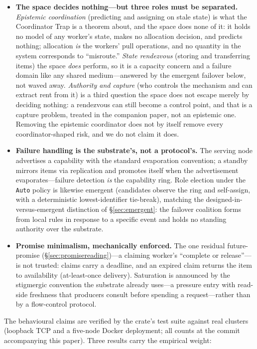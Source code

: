 \documentclass[11pt]{article}
\theoremstyle{definition}
\theoremstyle{plain}
\theoremstyle{plain}
\begin{document}
\begin{itemize}
\item \textbf{The space decides nothing---but three roles must be
  separated.} \emph{Epistemic coordination} (predicting and assigning on stale
  state) is what the Coordinator Trap is a theorem about, and the space does none of
  it: it holds no model of any worker's state, makes no allocation decision, and
  predicts nothing; allocation \emph{is} the workers' pull operations, and no
  quantity in the system corresponds to ``misroute.'' \emph{State rendezvous}
  (storing and transferring items) the space \emph{does} perform, so it is a capacity
  concern and a failure domain like any shared medium---answered by the emergent
  failover below, not waved away. \emph{Authority and capture} (who controls the
  mechanism and can extract rent from it) is a third question the space does not
  escape merely by deciding nothing: a rendezvous can still become a control point,
  and that is a capture problem, treated in the companion paper, not an epistemic
  one. Removing the epistemic coordinator does not by itself remove every
  coordinator-shaped risk, and we do not claim it does.
\item \textbf{Failure handling is the substrate's, not a protocol's.} The
  serving node advertises a capability with the standard evaporation
  convention; a standby mirrors items via replication and promotes itself
  when the advertisement evaporates---failure detection \emph{is} the
  capability ring. Role election under the \texttt{Auto} policy is
  likewise emergent (candidates observe the ring and self-assign, with a
  deterministic lowest-identifier tie-break), matching the
  designed-in-versus-emergent distinction of \S\ref{sec:emergent}: the
  failover coalition forms from local rules in response to a specific
  event and holds no standing authority over the substrate.
\item \textbf{Promise minimalism, mechanically enforced.} The one residual
  future-promise (\S\ref{sec:promisereading})---a claiming worker's
  ``complete or release''---is not trusted: claims carry a deadline, and
  an expired claim returns the item to availability (at-least-once
  delivery). Saturation is announced by the stigmergic convention the
  substrate already uses---a pressure entry with read-side freshness that
  producers consult before spending a request---rather than by a
  flow-control protocol.
\end{itemize}

The behavioural claims are verified by the crate's test suite against real
clusters (loopback TCP and a five-node Docker deployment; all counts at
the commit accompanying this paper). Three results carry the empirical
weight:
\end{document}
